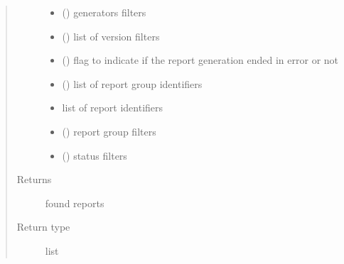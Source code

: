 \begin{fulllineitems}
\begin{fulllineitems}
\begin{quote}
\begin{description}
\begin{itemize}
\item {} 
 () \textendash{} generators filters

\item {} 
 () \textendash{} list of version filters

\item {} 
 () \textendash{} flag to indicate if the report generation ended in error or not

\item {} 
 () \textendash{} list of report group identifiers

\item {} 
 \textendash{} list of report identifiers

\item {} 
 () \textendash{} report group filters

\item {} 
 () \textendash{} status filters

\end{itemize}

\item[{Returns}] \leavevmode
found reports

\item[{Return type}] \leavevmode
list

\end{description}\end{quote}

\end{fulllineitems}



\end{fulllineitems}
